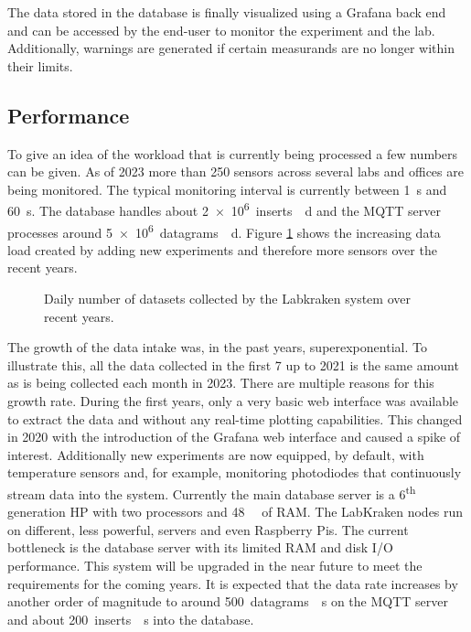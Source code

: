 The data stored in the database is finally visualized using a Grafana back end and can be accessed by the end-user to monitor the experiment and the lab. Additionally, warnings are generated if certain measurands are no longer within their limits.

\subsection{Performance}
To give an idea of the workload that is currently being processed a few numbers can be given. As of 2023 more than \num{250} sensors across several labs and offices are being monitored. The typical monitoring interval is currently between \qty{1}{\second} and \qty{60}{\second}. The database handles about \qty{2e6}{inserts \per \day} and the MQTT server processes around \qty{5e6}{datagrams \per \day}. Figure \ref{fig:kraken_inserts} shows the increasing data load created by adding new experiments and therefore more sensors over the recent years.
\begin{figure}[ht]
    \centering
    
    \caption{Daily number of datasets collected by the Labkraken system over recent years.}
    \label{fig:kraken_inserts}
\end{figure}

The growth of the data intake was, in the past years, superexponential. To illustrate this, all the data collected in the first \qty{7}{\year} up to 2021 is the same amount as is being collected each month in 2023. There are multiple reasons for this growth rate. During the first years, only a very basic web interface was available to extract the data and without any real-time plotting capabilities. This changed in 2020 with the introduction of the Grafana web interface and caused a spike of interest. Additionally new experiments are now equipped, by default, with temperature sensors and, for example, monitoring photodiodes that continuously stream data into the system. Currently the main database server is a 6\textsuperscript{th} generation HP  with two  processors and \qty{48}{\giga\byte} of RAM. The LabKraken nodes run on different, less powerful, servers and even Raspberry Pis. The current bottleneck is the database server with its limited RAM and disk I/O performance. This system will be upgraded in the near future to meet the requirements for the coming years. It is expected that the data rate increases by another order of magnitude to around \qty{500}{datagrams \per \second} on the MQTT server and about \qty{200}{inserts \per \second} into the database.

